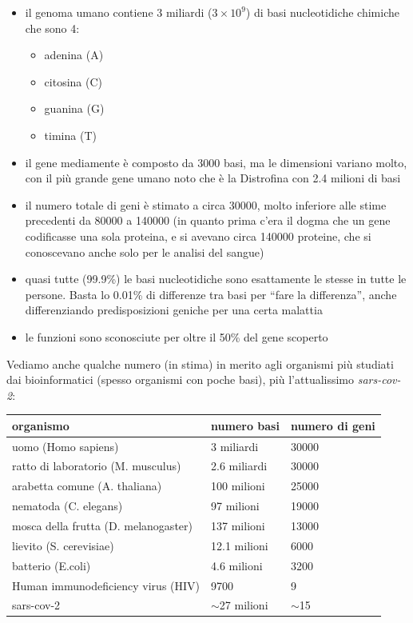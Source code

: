 \documentclass[a4paper,12pt, oneside]{book}
\begin{document}
\begin{itemize}
  \item il genoma umano contiene 3 miliardi ($3\times 10^9$) di basi
  nucleotidiche chimiche che sono 4:
  \begin{itemize}
    \item adenina (A)
    \item citosina (C)
    \item guanina (G)
    \item timina (T)
  \end{itemize}
  \item il gene mediamente è composto da 3000 basi, ma le dimensioni variano
  molto, con il più grande gene umano noto che è la Distrofina con 2.4 milioni
  di basi
  \item il numero totale di geni è stimato a circa 30000, molto inferiore alle
  stime precedenti da 80000 a 140000 (in quanto prima c'era il dogma che un
  gene codificasse una sola proteina, e si avevano circa 140000 proteine, che si
  conoscevano anche solo per le analisi del sangue)
  \item quasi tutte (99.9\%) le basi nucleotidiche sono esattamente le stesse in
  tutte le persone. Basta lo 0.01\% di differenze tra basi per ``fare la
  differenza'', anche differenziando predisposizioni geniche per una certa
  malattia
  \item le funzioni sono sconosciute per oltre il 50\% del gene scoperto 
\end{itemize}
Vediamo anche qualche numero (in stima) in merito agli organismi più studiati
dai bioinformatici (spesso organismi con poche basi), più l'attualissimo
\textit{sars-cov-2}: 
\begin{table}[H]
  \begin{tabular}{|l|l|l|}
    \hline organismo & numero basi & numero di geni \\
    \hline uomo (Homo sapiens) & 3 miliardi & 30000 \\
    \hline ratto di laboratorio (M. musculus) & 2.6 miliardi & 30000 \\
    \hline arabetta comune  (A. thaliana) & 100 milioni & 25000 \\
    \hline nematoda (C. elegans) & 97 milioni & 19000 \\
    \hline mosca della frutta (D. melanogaster) & 137 milioni & 13000 \\
    \hline lievito (S. cerevisiae) & 12.1 milioni & 6000 \\
    \hline batterio (E.coli) & 4.6 milioni & 3200 \\
    \hline Human immunodeficiency virus (HIV) & 9700 & 9 \\
    \hline sars-cov-2 & $\sim$27 milioni & $\sim$15 \\
    \hline
  \end{tabular}
\end{table}
\end{document}
